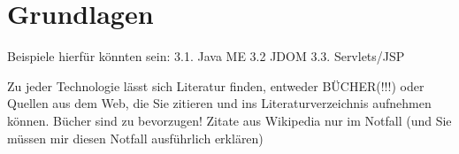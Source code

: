 \chapter{Grundlagen}

Beispiele hierfür könnten sein:  
3.1. Java ME  
3.2 JDOM  
3.3. Servlets/JSP  

Zu jeder Technologie lässt sich Literatur finden, entweder BÜCHER(!!!) oder Quellen aus dem Web, die Sie zitieren und ins Literaturverzeichnis aufnehmen können. Bücher sind zu bevorzugen! Zitate aus Wikipedia nur im Notfall (und Sie müssen mir diesen Notfall ausführlich erklären)  

